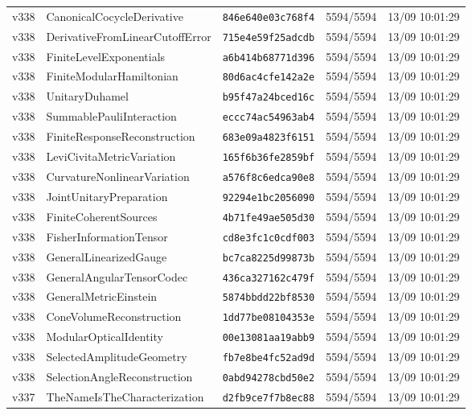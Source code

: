 \documentclass[11pt]{article}
\theoremstyle{definition}\newtheorem{deriv}{Derivação}
\begin{document}
{\begin{longtable}{@{}lllll@{}}
v338 & CanonicalCocycleDerivative & \texttt{846e640e03c768f4} & 5594/5594 & 13/09 10:01:29 \\
v338 & DerivativeFromLinearCutoffError & \texttt{715e4e59f25adcdb} & 5594/5594 & 13/09 10:01:29 \\
v338 & FiniteLevelExponentials & \texttt{a6b414b68771d396} & 5594/5594 & 13/09 10:01:29 \\
v338 & FiniteModularHamiltonian & \texttt{80d6ac4cfe142a2e} & 5594/5594 & 13/09 10:01:29 \\
v338 & UnitaryDuhamel & \texttt{b95f47a24bced16c} & 5594/5594 & 13/09 10:01:29 \\
v338 & SummablePauliInteraction & \texttt{eccc74ac54963ab4} & 5594/5594 & 13/09 10:01:29 \\
v338 & FiniteResponseReconstruction & \texttt{683e09a4823f6151} & 5594/5594 & 13/09 10:01:29 \\
v338 & LeviCivitaMetricVariation & \texttt{165f6b36fe2859bf} & 5594/5594 & 13/09 10:01:29 \\
v338 & CurvatureNonlinearVariation & \texttt{a576f8c6edca90e8} & 5594/5594 & 13/09 10:01:29 \\
v338 & JointUnitaryPreparation & \texttt{92294e1bc2056090} & 5594/5594 & 13/09 10:01:29 \\
v338 & FiniteCoherentSources & \texttt{4b71fe49ae505d30} & 5594/5594 & 13/09 10:01:29 \\
v338 & FisherInformationTensor & \texttt{cd8e3fc1c0cdf003} & 5594/5594 & 13/09 10:01:29 \\
v338 & GeneralLinearizedGauge & \texttt{bc7ca8225d99873b} & 5594/5594 & 13/09 10:01:29 \\
v338 & GeneralAngularTensorCodec & \texttt{436ca327162c479f} & 5594/5594 & 13/09 10:01:29 \\
v338 & GeneralMetricEinstein & \texttt{5874bbdd22bf8530} & 5594/5594 & 13/09 10:01:29 \\
v338 & ConeVolumeReconstruction & \texttt{1dd77be08104353e} & 5594/5594 & 13/09 10:01:29 \\
v338 & ModularOpticalIdentity & \texttt{00e13081aa19abb9} & 5594/5594 & 13/09 10:01:29 \\
v338 & SelectedAmplitudeGeometry & \texttt{fb7e8be4fc52ad9d} & 5594/5594 & 13/09 10:01:29 \\
v338 & SelectionAngleReconstruction & \texttt{0abd94278cbd50e2} & 5594/5594 & 13/09 10:01:29 \\
v337 & TheNameIsTheCharacterization & \texttt{d2fb9ce7f7b8ec88} & 5594/5594 & 13/09 10:01:29 \\

\end{longtable}}
\end{document}
